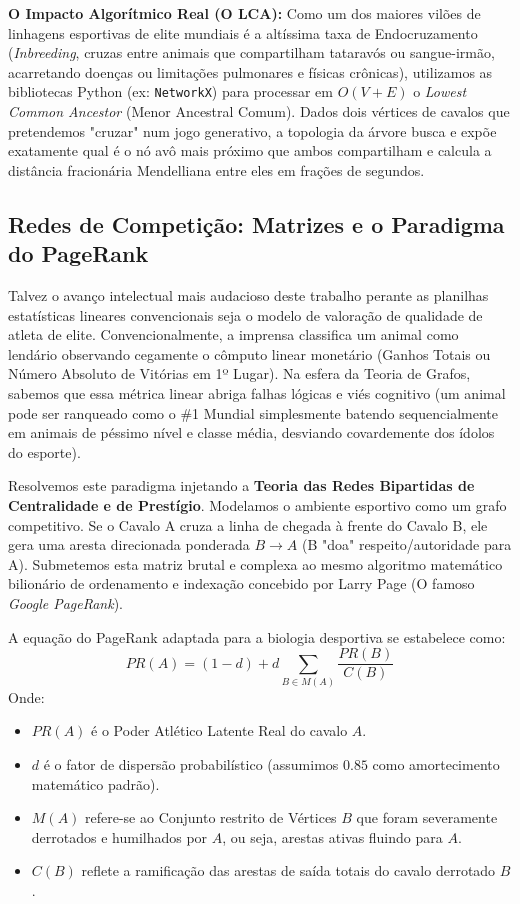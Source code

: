 \documentclass[12pt,a4paper]{article}
\begin{document}
\textbf{O Impacto Algorítmico Real (O LCA):} Como um dos maiores vilões de linhagens esportivas de elite mundiais é a altíssima taxa de Endocruzamento (\textit{Inbreeding}, cruzas entre animais que compartilham tataravós ou sangue-irmão, acarretando doenças ou limitações pulmonares e físicas crônicas), utilizamos as bibliotecas Python (ex: \texttt{NetworkX}) para processar em $O(V+E)$ o \textit{Lowest Common Ancestor} (Menor Ancestral Comum).
Dados dois vértices de cavalos que pretendemos "cruzar" num jogo generativo, a topologia da árvore busca e expõe exatamente qual é o nó avô mais próximo que ambos compartilham e calcula a distância fracionária Mendelliana entre eles em frações de segundos.

\subsection{Redes de Competição: Matrizes e o Paradigma do PageRank}
Talvez o avanço intelectual mais audacioso deste trabalho perante as planilhas estatísticas lineares convencionais seja o modelo de valoração de qualidade de atleta de elite.
Convencionalmente, a imprensa classifica um animal como lendário observando cegamente o cômputo linear monetário (Ganhos Totais ou Número Absoluto de Vitórias em 1º Lugar). Na esfera da Teoria de Grafos, sabemos que essa métrica linear abriga falhas lógicas e viés cognitivo (um animal pode ser ranqueado como o \#1 Mundial simplesmente batendo sequencialmente em animais de péssimo nível e classe média, desviando covardemente dos ídolos do esporte).

Resolvemos este paradigma injetando a \textbf{Teoria das Redes Bipartidas de Centralidade e de Prestígio}. Modelamos o ambiente esportivo como um grafo competitivo. Se o Cavalo A cruza a linha de chegada à frente do Cavalo B, ele gera uma aresta direcionada ponderada $B \to A$ (B "doa" respeito/autoridade para A). Submetemos esta matriz brutal e complexa ao mesmo algoritmo matemático bilionário de ordenamento e indexação concebido por Larry Page (O famoso \textit{Google PageRank}).

A equação do PageRank adaptada para a biologia desportiva se estabelece como:
\[ PR(A) = (1-d) + d \sum_{B \in M(A)} \frac{PR(B)}{C(B)} \]
Onde:
\begin{itemize}
    \item $PR(A)$ é o Poder Atlético Latente Real do cavalo $A$.
    \item $d$ é o fator de dispersão probabilístico (assumimos $0.85$ como amortecimento matemático padrão).
    \item $M(A)$ refere-se ao Conjunto restrito de Vértices $B$ que foram severamente derrotados e humilhados por $A$, ou seja, arestas ativas fluindo para $A$.
    \item $C(B)$ reflete a ramificação das arestas de saída totais do cavalo derrotado $B$.
\end{itemize}
\end{document}
